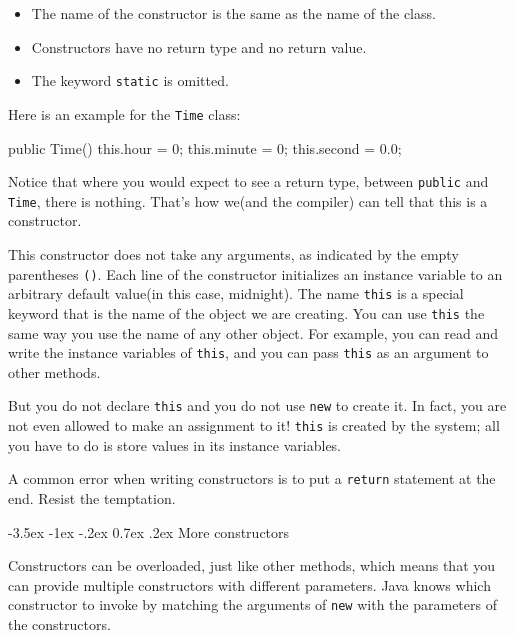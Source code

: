 \documentclass{book}
\makeatletter
\renewcommand{\section}{\@startsection 
    {section} {1} {0mm}%
    {-3.5ex \@plus -1ex \@minus -.2ex}%
    {0.7ex \@plus.2ex}%
    {\normalfont\Large\bfseries}}
\makeatother
\begin{document}
\begin{itemize}

\item The name of the constructor is the same as the name of
the class.

\item Constructors have no return type and no return value.

\item The keyword {\tt static} is omitted.

\end{itemize}

Here is an example for the {\tt Time} class:

\begin{verbatimtab}
  public Time() {
    this.hour = 0;
    this.minute = 0;
    this.second = 0.0;
  }
\end{verbatimtab}
%
Notice that where you would expect to see a return type,
between {\tt public} and {\tt Time}, there is nothing.  That's
how we(and the compiler) can tell that this is a constructor.

This constructor does not take any arguments, as indicated by the
empty parentheses {\tt()}.  Each line of the constructor initializes
an instance variable to an arbitrary default value(in this case,
midnight).  The name {\tt this} is a special
keyword that is the name of the object we are creating.  You can use
{\tt this} the same way you use the name of any other object.  For
example, you can read and write the instance variables of {\tt this},
and you can pass {\tt this} as an argument to other methods.


But you do not declare {\tt this} and you do not use {\tt new}
to create it.  In fact, you are not even allowed to make an
assignment to it!  {\tt this} is created by the system; all you
have to do is store values in its instance variables.

A common error when writing constructors is to put a {\tt return}
statement at the end.  Resist the temptation.

\section{More constructors}

Constructors can be overloaded, just like other methods,
which means that you can provide multiple constructors
with different parameters.  Java knows which constructor
to invoke by matching the arguments of {\tt new}
with the parameters of the constructors.
\end{document}
